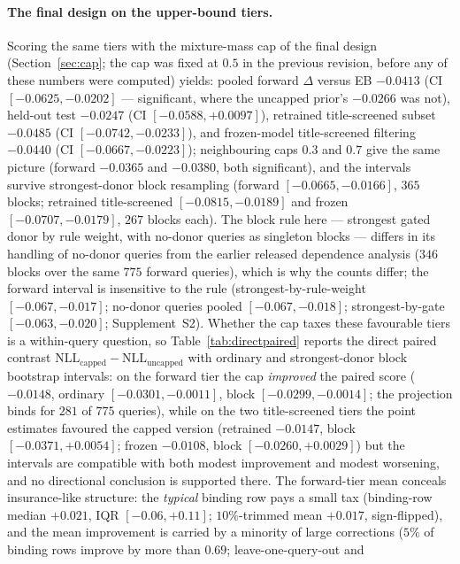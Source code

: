 \documentclass[11pt]{article}
\begin{document}
\paragraph{The final design on the upper-bound tiers.} Scoring the same
tiers with the mixture-mass cap of the final design
(Section~\ref{sec:cap}; the cap was fixed at $0.5$ in the previous revision,
before any of these numbers were computed) yields: pooled forward $\Delta$ versus EB
$-0.0413$ (CI $[-0.0625,-0.0202]$ --- significant, where the uncapped prior's
$-0.0266$ was not), held-out test $-0.0247$ (CI $[-0.0588,+0.0097]$),
retrained title-screened subset $-0.0485$ (CI $[-0.0742,-0.0233]$), and
frozen-model title-screened filtering $-0.0440$ (CI $[-0.0667,-0.0223]$);
neighbouring caps $0.3$ and $0.7$ give the same picture (forward $-0.0365$
and $-0.0380$, both significant), and the intervals survive strongest-donor
block resampling (forward $[-0.0665,-0.0166]$, $365$ blocks;
retrained title-screened $[-0.0815,-0.0189]$ and frozen $[-0.0707,-0.0179]$,
$267$ blocks each). The block rule here --- strongest gated donor by rule
weight, with no-donor queries as singleton blocks --- differs in its
handling of no-donor queries from the earlier released dependence
analysis ($346$ blocks over the same $775$ forward queries), which is why
the counts differ; the forward interval is insensitive to the rule
(strongest-by-rule-weight $[-0.067,-0.017]$; no-donor queries pooled
$[-0.067,-0.018]$; strongest-by-gate $[-0.063,-0.020]$; Supplement~S2).
Whether the cap taxes these favourable tiers is a within-query question,
so Table~\ref{tab:directpaired} reports the direct paired contrast
$\mathrm{NLL}_{\mathrm{capped}} - \mathrm{NLL}_{\mathrm{uncapped}}$ with
ordinary and strongest-donor block bootstrap intervals: on the forward
tier the cap \emph{improved} the paired score ($-0.0148$, ordinary
$[-0.0301,-0.0011]$, block $[-0.0299,-0.0014]$; the projection binds for
$281$ of $775$ queries), while on the two title-screened tiers the point
estimates favoured the capped version (retrained $-0.0147$, block
$[-0.0371,+0.0054]$; frozen $-0.0108$, block $[-0.0260,+0.0029]$) but
the intervals are compatible with both modest improvement and modest
worsening, and no directional conclusion is supported there. The
forward-tier mean conceals insurance-like structure: the \emph{typical}
binding row pays a small tax (binding-row median $+0.021$, IQR
$[-0.06,+0.11]$; $10\%$-trimmed mean $+0.017$, sign-flipped), and the
mean improvement is carried by a minority of large corrections ($5\%$ of
binding rows improve by more than $0.69$; leave-one-query-out and
\end{document}
